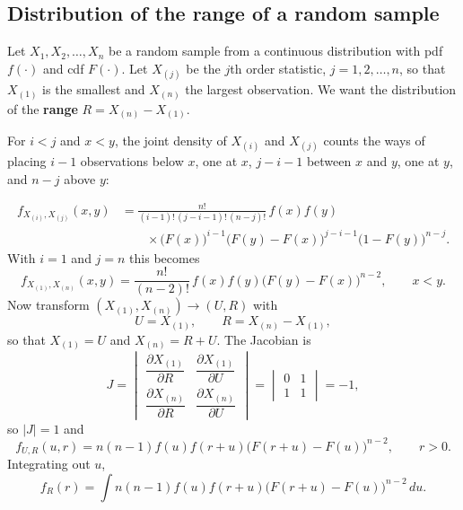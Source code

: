 \documentclass[11pt,a4paper]{article}
\theoremstyle{definition}
\begin{document}
\subsection{Distribution of the range of a random sample}
Let $X_1, X_2, \dots, X_n$ be a random sample from a continuous distribution with pdf $f(\cdot)$ and cdf $F(\cdot)$. Let $X_{(j)}$ be the $j$th order
statistic, $j = 1, 2, \dots, n$, so that $X_{(1)}$ is the smallest and $X_{(n)}$ the largest observation. We want the distribution of the \textbf{range}
$R = X_{(n)} - X_{(1)}$.

For $i < j$ and $x < y$, the joint density of $X_{(i)}$ and $X_{(j)}$ counts the ways of placing $i - 1$ observations below $x$, one at $x$, $j - i - 1$
between $x$ and $y$, one at $y$, and $n - j$ above $y$:
\begin{figure}[H]
\centering
{}
\end{figure}
\begin{align*}
f_{X_{(i)},X_{(j)}}(x, y) &= \frac{n!}{(i - 1)!\,(j - i - 1)!\,(n - j)!}\,f(x)f(y) \\
&\qquad \times \bigl(F(x)\bigr)^{i-1}\bigl(F(y) - F(x)\bigr)^{j-i-1}\bigl(1 - F(y)\bigr)^{n-j} .
\end{align*}
With $i = 1$ and $j = n$ this becomes
\[
f_{X_{(1)},X_{(n)}}(x, y) = \frac{n!}{(n - 2)!}\,f(x)f(y)\bigl(F(y) - F(x)\bigr)^{n-2} , \qquad x < y .
\]
Now transform $(X_{(1)}, X_{(n)}) \to (U, R)$ with
\[
U = X_{(1)} , \qquad R = X_{(n)} - X_{(1)} ,
\]
so that $X_{(1)} = U$ and $X_{(n)} = R + U$.
The Jacobian is
\[
J = \begin{vmatrix} \dfrac{\partial X_{(1)}}{\partial R} & \dfrac{\partial X_{(1)}}{\partial U} \\[2ex] \dfrac{\partial X_{(n)}}{\partial R} & \dfrac{\partial X_{(n)}}{\partial U} \end{vmatrix}
= \begin{vmatrix} 0 & 1 \\ 1 & 1 \end{vmatrix} = -1 ,
\]
so $|J| = 1$ and
\[
f_{U,R}(u, r) = n(n - 1)f(u)f(r + u)\bigl(F(r + u) - F(u)\bigr)^{n-2} , \qquad r > 0 .
\]
Integrating out $u$,
\[
f_R(r) = \int n(n - 1)f(u)f(r + u)\bigl(F(r + u) - F(u)\bigr)^{n-2}\,du .
\]
\end{document}
